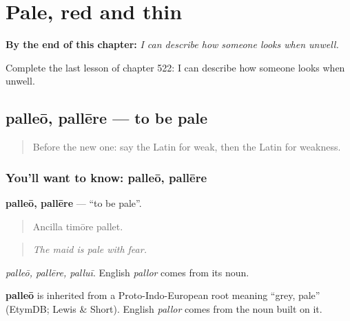 
\chapter{Pale, red and thin}
\label{ch:la-pale-red-and-thin}

\begin{chapteropening}
\textbf{By the end of this chapter:} \emph{I can describe how someone looks when unwell.}

Complete the last lesson of chapter 522: I can describe how someone looks when unwell.
\end{chapteropening}

\section[palleō, pallēre]{palleō, pallēre — to be pale}

\label{lesson:LA-C522-palleo}



\begin{quote}
Before the new one: say the Latin for weak, then the Latin for weakness.
\end{quote}

\subsection*{You'll want to know: palleō, pallēre}
\textbf{palleō, pallēre} — \textquotedblleft{}to be pale\textquotedblright{}.

\begin{quote}
Ancilla timōre pallet.
\end{quote}

\begin{quote}
\emph{The maid is pale with fear.}
\end{quote}

\emph{palleō, pallēre, palluī}. English \emph{pallor} comes from its noun.

\begin{cousinweb}
\textbf{palleō} is inherited from a Proto-Indo-European root meaning \textquotedblleft{}grey, pale\textquotedblright{} (EtymDB; Lewis \& Short). English \emph{pallor} comes from the noun built on it.
\end{cousinweb}

